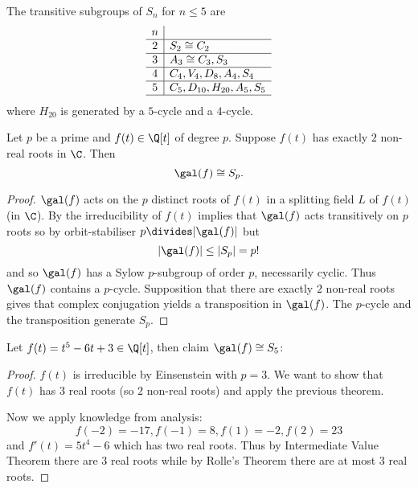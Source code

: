 \documentclass[a4paper]{article}
\begin{document}
\begin{lemma}
  \label{lem:transitive subgroups of Sn}
  The transitive subgroups of \(S_n\) for \(n \leq 5\) are
  \[
  \begin{array}[h]{c|l}
    n & \\ \hline
    2 & S_2 \cong C_2 \\ \hline
    3 & A_3 \cong C_3, S_3 \\ \hline
    4 & C_4, V_4, D_8, A_4, S_4 \\ \hline
    5 & C_5, D_{10}, H_{20}, A_5, S_5 \\ \hline
  \end{array}
  \]
  where \(H_{20}\) is generated by a \(5\)-cycle and a \(4\)-cycle.
\end{lemma}

\begin{theorem}
  \label{thm:galois group Sp}
  Let \(p\) be a prime and \(f(t) \in \Q[t]\) of degree \(p\). Suppose \(f(t)\) has exactly \(2\) non-real roots in \(\C\). Then
  \[
    \gal(f) \cong S_p.
  \]
\end{theorem}

\begin{proof}
  \(\gal(f)\) acts on the \(p\) distinct roots of \(f(t)\) in a splitting field \(L\) of \(f(t)\) (in \(\C\)). By  the irreducibility of \(f(t)\) implies that \(\gal(f)\) acts transitively on \(p\) roots so by orbit-stabiliser \(p \divides |\gal(f)|\) but
  \[
    |\gal(f)| \leq |S_p| = p!
  \]
  and so \(\gal(f)\) has a Sylow \(p\)-subgroup of order \(p\), necessarily cyclic. Thus \(\gal(f)\) contains a \(p\)-cycle. Supposition that there are exactly \(2\) non-real roots gives that complex conjugation yields a transposition in \(\gal(f)\). The \(p\)-cycle and the transposition generate \(S_p\).
\end{proof}

\begin{eg}
  Let \(f(t) = t^5 - 6t + 3 \in \Q[t]\), then claim \(\gal(f) \cong S_5\):

  \begin{proof}
    \(f(t)\) is irreducible by Einsenstein with \(p = 3\). We want to show that \(f(t)\) has \(3\) real roots (so \(2\) non-real roots) and apply the previous theorem.

    Now we apply knowledge from analysis:
    \[
      f(-2) = -17, f(-1) = 8, f(1) = -2, f(2) = 23
    \]
    and \(f'(t) = 5t^4 - 6\) which has two real roots. Thus by Intermediate Value Theorem there are \(3\) real roots while by Rolle's Theorem there are at most \(3\) real roots.
  \end{proof}
\end{eg}
\end{document}
